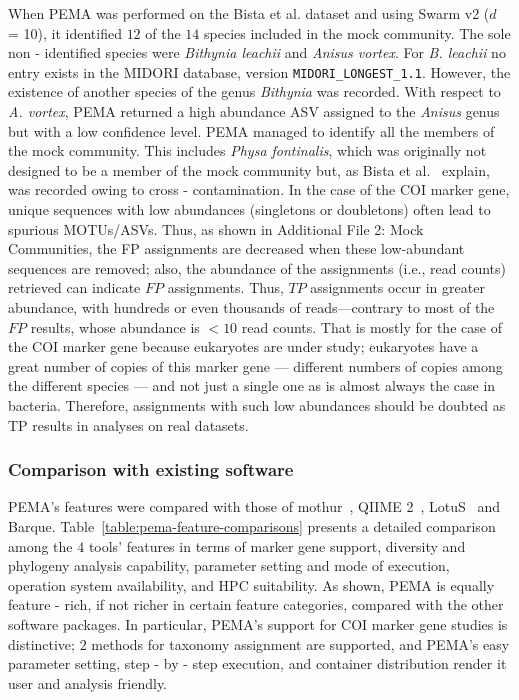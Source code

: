       When PEMA was performed on the Bista et al. dataset \cite{bista2018performance} and using Swarm v2 ($d$ = 10), it identified $12$ of the $14$ species included in the mock community. 
      The sole non - identified species were \textit{Bithynia leachii} and \textit{Anisus vortex}. For \textit{B. leachii} no entry exists in the MIDORI database, version \texttt{MIDORI\_LONGEST\_1.1}. 
      However, the existence of another species of the genus \textit{Bithynia} was recorded. 
      With respect to \textit{A. vortex}, PEMA returned a high abundance ASV assigned to the \textit{Anisus} genus but with a low confidence level. 
      PEMA managed to identify all the members of the mock community. 
      This includes \textit{Physa fontinalis}, which was originally not designed to be a member of the mock community but, as Bista et al.~\cite{bista2018performance} explain, was recorded owing to cross - contamination. 
      In the case of the COI marker gene, unique sequences with low abundances (singletons or doubletons) often lead to spurious MOTUs/ASVs. 
      Thus, as shown in Additional File 2: Mock Communities, the FP assignments are decreased when these low-abundant sequences are removed; 
      also, the abundance of the assignments (i.e., read counts) retrieved can indicate $FP$ assignments. 
      Thus, $TP$ assignments occur in greater abundance, with hundreds or even thousands of reads—contrary to most of the $FP$ results, whose abundance is $<10$ read counts. 
      That is mostly for the case of the COI marker gene because eukaryotes are under study; 
      eukaryotes have a great number of copies of this marker gene — different numbers of copies among the different species — and not just a single one as is almost always the case in bacteria. 
      Therefore, assignments with such low abundances should be doubted as TP results in analyses on real datasets.



   \subsubsection*{Comparison with existing software}

      PEMA's features were compared with those of mothur~\cite{schloss2009introducing}, QIIME 2~\cite{bolyen2018qiime}, LotuS~\cite{hildebrand2014lotus} and Barque. 
      Table~\ref{table:pema-feature-comparisons} presents a detailed comparison among the $4$ tools' features in terms of marker gene support, diversity and phylogeny analysis capability, parameter setting and mode of execution, operation system availability, and HPC suitability. 
      As shown, PEMA is equally feature - rich, if not richer in certain feature categories, compared with the other software packages. In particular, PEMA's support for COI marker gene studies is distinctive; 
      $2$ methods for taxonomy assignment are supported, and PEMA's easy parameter setting, step - by - step execution, and container distribution render it user and analysis friendly.

